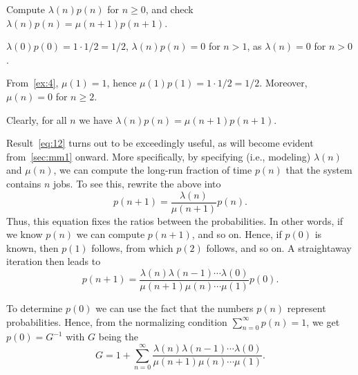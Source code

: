 \begin{exercise}
 Compute $\lambda(n) p(n)$ for $n\geq 0$, and check $\lambda(n) p(n) = \mu(n+1) p(n+1)$.
\begin{solution}
  $\lambda(0)p(0)=1\cdot 1/2 = 1/2$, $\lambda(n)p(n)= 0$ for $n>1$, as $\lambda(n)=0$ for $n>0$.

From~\cref{ex:4}, $\mu(1)=1$, hence $\mu(1) p(1) = 1\cdot 1/2 = 1/2$. Moreover, $\mu(n)=0$ for $n\geq 2$. 

Clearly, for all $n$ we have $\lambda(n)p(n)= \mu(n+1)p(n+1)$. 

\end{solution}
\end{exercise}

Result~\cref{eq:12} turns out to be exceedingly useful, as will become evident from~\cref{sec:mm1} onward.
More specifically, by specifying (i.e., modeling) $\lambda(n)$ and $\mu(n)$, we can compute the long-run fraction of time $p(n)$ that the system contains $n$ jobs.
To see this, rewrite the above into
\begin{equation}\label{eq:25}
  p(n+1) = \frac{\lambda(n)}{\mu(n+1)}p(n). 
\end{equation}
Thus, this equation fixes the ratios between the probabilities. In other words, if we know $p(n)$ we can compute $p(n+1)$, and so on. Hence, if $p(0)$ is known, then $p(1)$ follows, from which $p(2)$
follows, and so on. A straightaway iteration then leads to
\begin{equation}\label{eq:38}
  p(n+1) = \frac{\lambda(n)\lambda(n-1)\cdots \lambda(0)}{\mu(n+1)\mu(n)\cdots \mu(1)}p(0).
\end{equation}

To determine $p(0)$ we can use the fact that the numbers $p(n)$ represent probabilities.
Hence, from the normalizing condition $\sum_{n=0}^\infty p(n)=1$, we get $p(0) = G^{-1}$ with
$G$ being the 
\begin{equation}
  \label{eq:20}
G = 1+\sum_{n=0}^\infty \frac{\lambda(n)\lambda(n-1)\cdots\lambda(0)}{\mu(n+1)\mu(n)\cdots \mu(1)}.
\end{equation}

